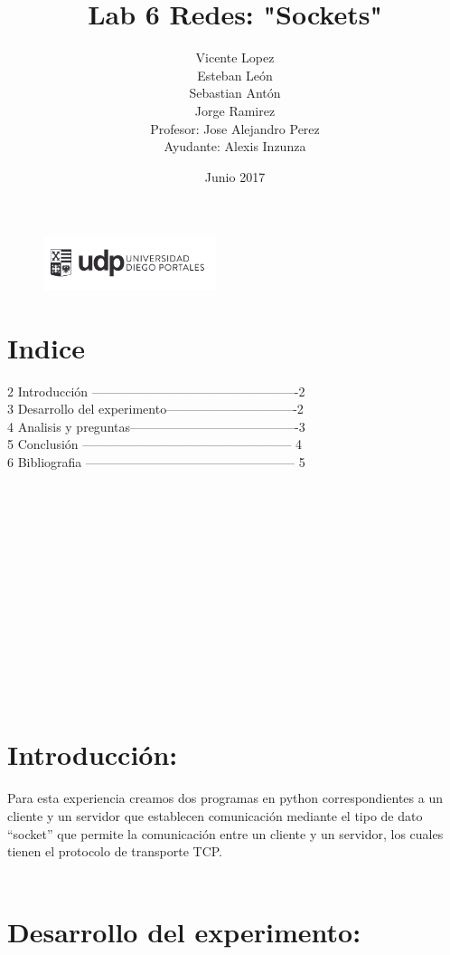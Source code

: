 \documentclass{article}
\title{Lab 6 Redes: "Sockets"}
\author{Vicente Lopez\\Esteban León\\Sebastian Antón\\Jorge Ramirez\\Profesor: Jose Alejandro Perez\\Ayudante: Alexis Inzunza}
\date{Junio 2017}
\begin{document}
\begin{figure}[h]
\includegraphics[width=0.45\textwidth]{logo_udp.png}
\maketitle
\end{figure}

\section{Indice}

2 Introducción -------------------------------------------------2\\
3 Desarrollo del experimento-------------------------------2\\
4 Analisis y preguntas----------------------------------------3\\
5 Conclusión -------------------------------------------------- 4\\
6 Bibliografia -------------------------------------------------- 5\\\\\\\\\\\\\\\\\\\\\\\\\\\\

\section{Introducción:}

Para esta experiencia creamos dos programas en python correspondientes a un cliente y un servidor que establecen comunicación mediante el tipo de dato “socket” que permite la comunicación entre un cliente y un servidor, los cuales tienen el protocolo de transporte TCP.\\\\

\section{Desarrollo del experimento:}
\end{document}
